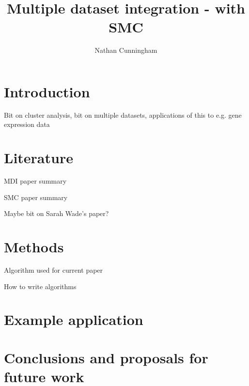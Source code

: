 \documentclass[10pt,a4paper]{report}
\author{Nathan Cunningham}
\title{Multiple dataset integration  - with SMC}
\begin{document}
\section{Introduction}
Bit on cluster analysis, bit on multiple datasets, applications of this to e.g. gene expression data



\section{Literature}
MDI paper summary

SMC paper summary

Maybe bit on Sarah Wade's paper?
\cite{wade2015bayesian}
\section{Methods}
Algorithm used for current paper

\begin{algorithm}[H]
 \caption{How to write algorithms}
\end{algorithm}
\section{Example application}

\section{Conclusions and proposals for future work}






\end{document}
